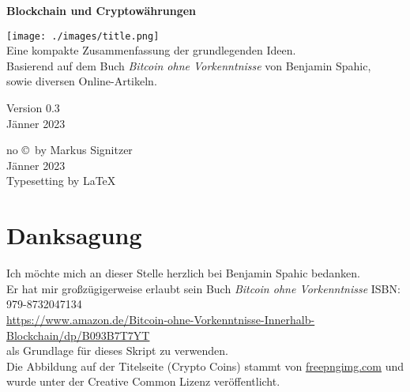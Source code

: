 \documentclass[10pt,a4paper,titlepage]{article}
\begin{document}
\begin{center}
		\vspace*{.5cm}
		
		\Huge \bf Blockchain und Cryptowährungen\\
		\vspace{.6cm}
		
		\texttt{[image: ./images/title.png]}\\
		
		
		
		
		\vspace{1.5cm}
		\huge Eine kompakte Zusammenfassung der grundlegenden Ideen.\\
		\vspace{2cm}
		\Large Basierend auf dem Buch \textit{Bitcoin ohne Vorkenntnisse} von Benjamin Spahic,\\ sowie diversen Online-Artikeln.
		\vspace*{1.5cm}
		
		\Large Version 0.3\\
		\large Jänner 2023\\[30pt]
		\vspace{1cm}
		
		
	\vspace*{1cm}	
	
		

        \large no \copyright\ by Markus Signitzer\\
        Jänner 2023\\
      
        \vspace{5mm}
        Typesetting by \LaTeX
\end{center}
\newpage    %


\tableofcontents
\newpage
\listoffigures
\listoftables
\clearpage

\section{Danksagung}
Ich möchte mich an dieser Stelle herzlich bei Benjamin Spahic bedanken.\\ Er hat mir großzügigerweise erlaubt sein Buch \textit{Bitcoin ohne Vorkenntnisse} ISBN: 979-8732047134\\ \href{https://www.amazon.de/Bitcoin-ohne-Vorkenntnisse-Innerhalb-Blockchain/dp/B093B7T7YT}{\color{blue}https://www.amazon.de/Bitcoin-ohne-Vorkenntnisse-Innerhalb-Blockchain/dp/B093B7T7YT} \\als Grundlage für dieses Skript zu verwenden.
\vspace{.3cm}\\
Die Abbildung auf der Titelseite (Crypto Coins) stammt von \href{https://freepngimg.com/thumb/bitcoin/63423-binary-option-exchange-bitcoin-trade-cryptocurrency-investment.png}{\color{blue}freepngimg.com} und wurde unter der Creative Common Lizenz veröffentlicht.
\end{document}
